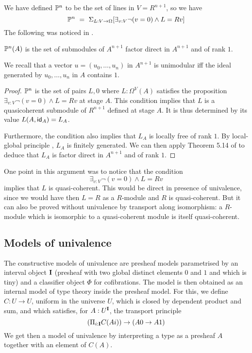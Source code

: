 We have defined $\mathbb{P}^n$ to be the set of lines in $V = R^{n+1}$, so we have
$$
\mathbb{P}^n ~=~ \Sigma_{L:V\rightarrow \Omega}[\exists_{v:V}\neg (v = 0)\wedge L = R v]
$$
The following was noticed in \cite{kockreyes}.

\begin{proposition}
  $\mathbb{P}^n(A)$ is the set of submodules of $A^{n+1}$ factor direct in $A^{n+1}$ and of rank $1$.
\end{proposition}

We recall \cite{lombardi-quitte}
that a vector $u = (u_0,\dots,u_n)$ in $A^{n+1}$ is unimodular iff the ideal generated by $u_0,\dots,u_n$ in $A$ contains $1$.

\begin{proof}
  $\mathbb{P}^n$ is the set of pairs $L,0$ where $L:\Omega^V(A)$ satisfies the proposition $\exists_{v:V}\neg (v = 0)\wedge L = Rv$ at stage
  $A$. This condition implies that $L$ is a quasicoherent submodule of $R^{n+1}$ defined at stage $A$.
  It is thus determined by its value $L(A,\mathsf{id}_A) = L_A$.

  Furthermore, the condition also implies that $L_A$ is locally free of rank $1$. By local-global principle \cite{lombardi-quitte},
  $L_A$ is finitely generated. We can then apply Theorem 5.14 of
  \cite{lombardi-quitte} to deduce that $L_A$ is factor direct in $A^{n+1}$ and of rank $1$.
\end{proof}

One point in this argument was to notice that the condition
$$
\exists_{v:V}\neg (v = 0)\wedge L = R v
$$
implies that $L$ is quasi-coherent. This would be direct in presence of univalence, since we would have then $L = R$ as a $R$-module
and $R$ is quasi-coherent. But it can also be proved without univalence by transport along isomorphism: a $R$-module which is
isomorphic to a quasi-coherent module is itself quasi-coherent.

\subsection{Models of univalence}

The constructive models of univalence are presheaf models parametrised by an interval object $\mathbf{I}$
(presheaf with two global distinct elements $0$ and $1$ and which is tiny) and a classifier object
$\Phi$ for cofibrations. The model is then obtained as an internal model of type theory inside the
presheaf model. For this, we define $C:U\rightarrow U$, uniform in the universe $U$,
which is closed by dependent product and sum, and which satisfies, for $A:U^{\mathbf{I}}$, the transport principle
$$
(\Pi_{i:\mathbf{I}}C(Ai))\rightarrow (A0\rightarrow A1)
$$
We get then a model of univalence by interpreting a type as a presheaf $A$ together with an element
of $C(A)$.


